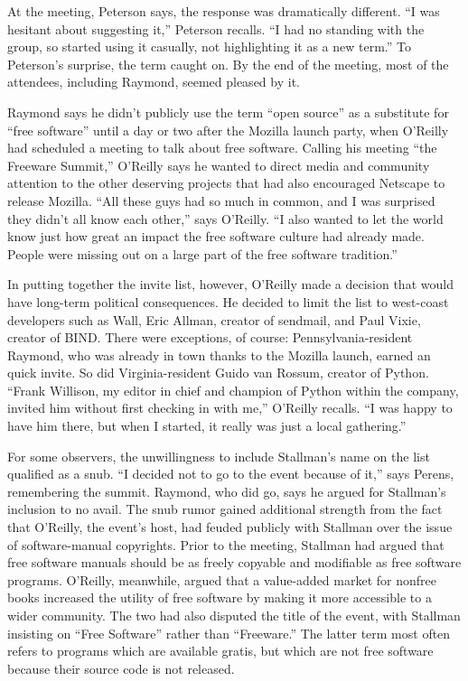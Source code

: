 \fi

\ifdefined\eng
At the meeting, Peterson says, the response was dramatically different. ``I was hesitant about suggesting it,'' Peterson recalls. ``I had no standing with the group, so started using it casually, not highlighting it as a new term.'' To Peterson's surprise, the term caught on. By the end of the meeting, most of the attendees, including Raymond, seemed pleased by it.
\fi

\ifdefined\chs

\fi

\ifdefined\eng
Raymond says he didn't publicly use the term ``open source'' as a substitute for ``free software'' until a day or two after the Mozilla launch party, when O'Reilly had scheduled a meeting to talk about free software. Calling his meeting ``the Freeware Summit,'' O'Reilly says he wanted to direct media and community attention to the other deserving projects that had also encouraged Netscape to release Mozilla. ``All these guys had so much in common, and I was surprised they didn't all know each other,'' says O'Reilly. ``I also wanted to let the world know just how great an impact the free software culture had already made. People were missing out on a large part of the free software tradition.''
\fi

\ifdefined\chs

\fi

\ifdefined\eng
In putting together the invite list, however, O'Reilly made a decision that would have long-term political consequences. He decided to limit the list to west-coast developers such as Wall, Eric Allman, creator of sendmail, and Paul Vixie, creator of BIND. There were exceptions, of course: Pennsylvania-resident Raymond, who was already in town thanks to the Mozilla launch, earned an quick invite. So did Virginia-resident Guido van Rossum, creator of Python. ``Frank Willison, my editor in chief and champion of Python within the company, invited him without first checking in with me,'' O'Reilly recalls. ``I was happy to have him there, but when I started, it really was just a local gathering.''
\fi

\ifdefined\chs

\fi

\ifdefined\eng
For some observers, the unwillingness to include Stallman's name on the list qualified as a snub. ``I decided not to go to the event because of it,'' says Perens, remembering the summit. Raymond, who did go, says he argued for Stallman's inclusion to no avail. The snub rumor gained additional strength from the fact that O'Reilly, the event's host, had feuded publicly with Stallman over the issue of software-manual copyrights. Prior to the meeting, Stallman had argued that free software manuals should be as freely copyable and modifiable as free software programs. O'Reilly, meanwhile, argued that a value-added market for nonfree books increased the utility of free software by making it more accessible to a wider community. The two had also disputed the title of the event, with Stallman insisting on ``Free Software'' rather than ``Freeware.''  The latter term most often refers to programs which are available gratis, but which are not free software because their source code is not released.
\fi

